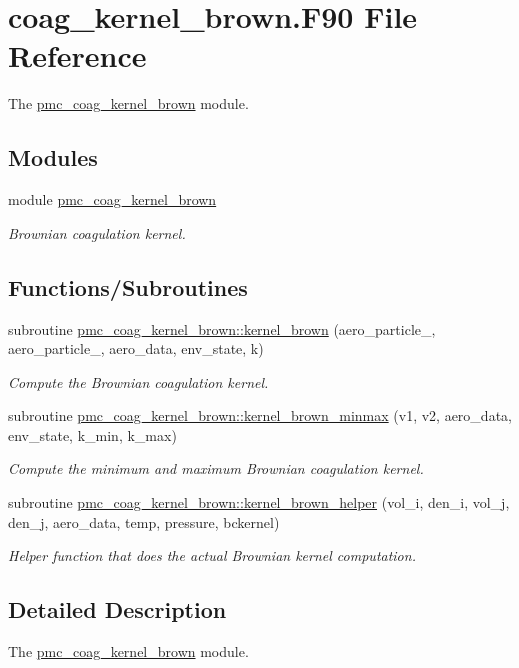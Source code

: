 \hypertarget{coag__kernel__brown_8_f90}{}\section{coag\+\_\+kernel\+\_\+brown.\+F90 File Reference}
\label{coag__kernel__brown_8_f90}


The \mbox{\hyperlink{namespacepmc__coag__kernel__brown}{pmc\+\_\+coag\+\_\+kernel\+\_\+brown}} module.  


\subsection*{Modules}
\begin{DoxyCompactItemize}
\item 
module \mbox{\hyperlink{namespacepmc__coag__kernel__brown}{pmc\+\_\+coag\+\_\+kernel\+\_\+brown}}
\begin{DoxyCompactList}\small\item\em Brownian coagulation kernel. \end{DoxyCompactList}\end{DoxyCompactItemize}
\subsection*{Functions/\+Subroutines}
\begin{DoxyCompactItemize}
\item 
subroutine \mbox{\hyperlink{namespacepmc__coag__kernel__brown_a88a16189fef47e9f6fdb1f8c5ad6030a}{pmc\+\_\+coag\+\_\+kernel\+\_\+brown\+::kernel\+\_\+brown}} (aero\+\_\+particle\+\_, aero\+\_\+particle\+\_, aero\+\_\+data, env\+\_\+state, k)
\begin{DoxyCompactList}\small\item\em Compute the Brownian coagulation kernel. \end{DoxyCompactList}\item 
subroutine \mbox{\hyperlink{namespacepmc__coag__kernel__brown_a928b39a678ff6d18c4794e313257f771}{pmc\+\_\+coag\+\_\+kernel\+\_\+brown\+::kernel\+\_\+brown\+\_\+minmax}} (v1, v2, aero\+\_\+data, env\+\_\+state, k\+\_\+min, k\+\_\+max)
\begin{DoxyCompactList}\small\item\em Compute the minimum and maximum Brownian coagulation kernel. \end{DoxyCompactList}\item 
subroutine \mbox{\hyperlink{namespacepmc__coag__kernel__brown_af427aeba502e7eb29067289245b3515f}{pmc\+\_\+coag\+\_\+kernel\+\_\+brown\+::kernel\+\_\+brown\+\_\+helper}} (vol\+\_\+i, den\+\_\+i, vol\+\_\+j, den\+\_\+j, aero\+\_\+data, temp, pressure, bckernel)
\begin{DoxyCompactList}\small\item\em Helper function that does the actual Brownian kernel computation. \end{DoxyCompactList}\end{DoxyCompactItemize}


\subsection{Detailed Description}
The \mbox{\hyperlink{namespacepmc__coag__kernel__brown}{pmc\+\_\+coag\+\_\+kernel\+\_\+brown}} module. 

